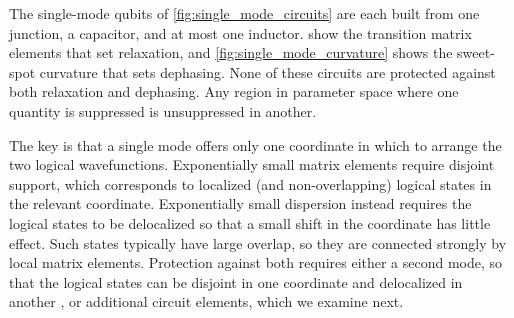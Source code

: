 
The single-mode qubits of \cref{fig:single_mode_circuits} are each built from one junction, a capacitor, and at most one inductor.
 show the transition matrix elements that set relaxation, and \cref{fig:single_mode_curvature} shows the sweet-spot curvature that sets dephasing.
None of these circuits are protected against both relaxation and dephasing.
Any region in parameter space where one quantity is suppressed is unsuppressed in another.

The key is that a single mode offers only one coordinate in which to arrange the two logical wavefunctions.
Exponentially small matrix elements require disjoint support, which corresponds to localized (and non-overlapping) logical states in the relevant coordinate.
Exponentially small dispersion instead requires the logical states to be delocalized so that a small shift in the coordinate has little effect.
Such states typically have large overlap, so they are connected strongly by local matrix elements.
Protection against both requires either a second mode, so that the logical states can be disjoint in one coordinate and delocalized in another \cite{gyenisMovingTransmonNoiseProtected2021b}, or additional circuit elements, which we examine next.

